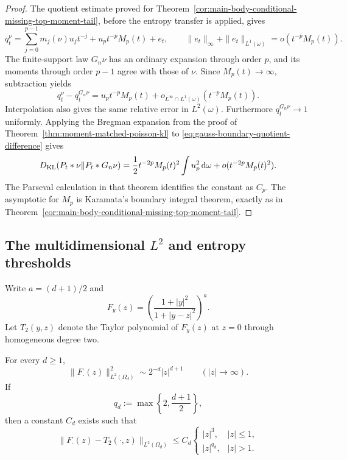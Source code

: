 \begin{proof}
The quotient estimate proved for
Theorem~\ref{cor:main-body-conditional-missing-top-moment-tail}, before the
entropy transfer is applied, gives
\[
 q_t^\nu
 =\sum_{j=0}^{p-1}m_j(\nu)u_jt^{-j}
 +u_pt^{-p}M_p(t)+e_t,
 \qquad
 \|e_t\|_\infty+\|e_t\|_{L^1(\omega)}
 =o(t^{-p}M_p(t)).
\]
The finite-support law \(G_n\nu\) has an ordinary expansion through order
\(p\), and its moments through order \(p-1\) agree with those of \(\nu\).
Since \(M_p(t)\to\infty\), subtraction yields
\begin{equation}\label{eq:gauss-boundary-quotient-difference}
 q_t^\nu-q_t^{G_n\nu}
 =u_pt^{-p}M_p(t)+o_{L^\infty\cap L^1(\omega)}
 (t^{-p}M_p(t)).
\end{equation}
Interpolation also gives the same relative error in \(L^2(\omega)\).
Furthermore \(q_t^{G_n\nu}\to1\) uniformly.  Applying the Bregman expansion
from the proof of Theorem~\ref{thm:moment-matched-poisson-kl} to
\eqref{eq:gauss-boundary-quotient-difference} gives
\[
 D_{\rm KL}(P_t*\nu\|P_t*G_n\nu)
 =\frac12t^{-2p}M_p(t)^2\int u_p^2\,\mathrm{d}\omega
 +o(t^{-2p}M_p(t)^2).
\]
The Parseval calculation in that theorem identifies the constant as \(C_p\).
The asymptotic for \(M_p\) is Karamata's boundary integral theorem, exactly
as in Theorem~\ref{cor:main-body-conditional-missing-top-moment-tail}.
\end{proof}

\subsection{The multidimensional \texorpdfstring{\(L^2\)}{L2} and entropy
thresholds}

Write \(a=(d+1)/2\) and
\[
 F_y(z)=\left(\frac{1+|y|^2}{1+|y-z|^2}\right)^a.
\]
Let \(T_2(y,z)\) denote the Taylor polynomial of \(F_y(z)\) at \(z=0\)
through homogeneous degree two.

\begin{lemma}
\label{lem:multidim-large-translation-l2-growth}
For every \(d\ge1\),
\begin{equation}\label{eq:translated-quotient-l2-asymptotic}
 \|F_\cdot(z)\|_{L^2(\Omega_d)}^2
 \sim2^{-d}|z|^{d+1}\qquad(|z|\to\infty).
\end{equation}
If
\[
 q_d:=\max\left\{2,\frac{d+1}{2}\right\},
\]
then a constant \(C_d\) exists such that
\begin{equation}\label{eq:second-order-l2-global-remainder}
 \|F_\cdot(z)-T_2(\cdot,z)\|_{L^2(\Omega_d)}
 \le C_d
 \begin{cases}|z|^3,&|z|\le1,\\ |z|^{q_d},&|z|>1.
 \end{cases}
\end{equation}
\end{lemma}

